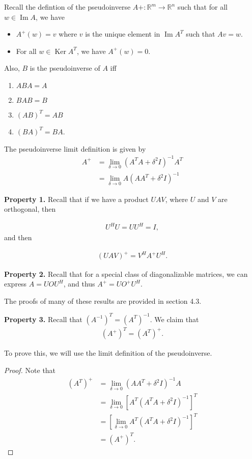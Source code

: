 \documentclass{article}
\newcommand{\RR}{\mathbb{R}}
\DeclareMathOperator{\Ker}{Ker}
\DeclareMathOperator{\Ima}{Im}
\DeclareMathOperator{\Ima}{Im}
\begin{document}
Recall the defintion of the pseudoinverse $A+: \RR^m \to \RR^n$ such that for all $w \in \Ima A$, we have

\begin{itemize}
  \item $A^{+}(w) = v$
    where $v$ is the unique element in $\Ima A^T$ such that $Av = w$.
  \item For all $w \in \Ker A^T$, we have $A^{+} (w) = 0$.
\end{itemize}

Also, $B$ is the pseudoinverse of $A$ iff
\begin{enumerate}
  \item $ABA = A$
  \item $BAB = B$
  \item $(AB)^T = AB$
  \item $(BA)^T = BA$.
\end{enumerate}

The pseudoinverse limit definition is given by
\begin{align*}
  A^{+} &= \lim_{\delta \to 0} (A^T A + \delta^2 I)^{-1} A^T \\
  &= \lim_{\delta \to 0} A (A A ^T + \delta^2 I)^{-1}
\end{align*} 

{\bf Property 1.} Recall that if we have a product $UAV$, where $U$ and $V$ are orthogonal, then

\begin{align*}
  U^H U = U U^H = I,
\end{align*}
and then

\begin{align*}
  (U A V)^{+} = V^{H} A^{+} U^{H}.
\end{align*}

{\bf Property 2.} Recall that for a special class of diagonalizable matrices, we can express $A = U O U^H$, and thus $A^{+} = U O^{+} U^{H}$.

The proofs of many of these results are provided in section 4.3.

{\bf Property 3.} Recall that $(A^{-1})^{T} = (A^{T})^{-1}$.  We claim that
\begin{align*}
  (A^{+})^{T} = (A^T)^{+}.
\end{align*}

To prove this, we will use the limit definition of the pseudoinverse.

\begin{proof}
  Note that
  \begin{align*}
    (A^T)^{+} &= \lim_{\delta \to 0} (A A^T + \delta^2 I)^{-1} A \\
    &= \lim_{\delta \to 0} [A^T (A^T A + \delta^2 I)^{-1}]^{T} \\
    &= [\lim_{\delta \to 0} A^T (A^T A + \delta^2 I)^{-1}]^T \\
    &= (A^{+})^T.
  \end{align*}
\end{proof}
\end{document}
